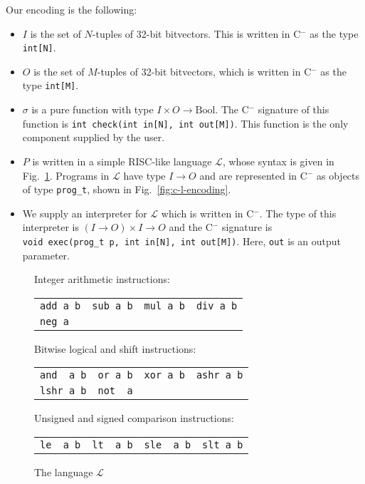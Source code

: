 \documentclass[a4paper]{llncs}
\newcommand{\newC}{C$^-$\xspace}
\begin{document}
Our encoding is the following:
%
\begin{itemize}
 \item $I$ is the set of $N$-tuples of 32-bit bitvectors.  This is written in \newC as the type \verb|int[N]|.
 \item $O$ is the set of $M$-tuples of 32-bit bitvectors, which is written in \newC as the type \verb|int[M]|.
 \item $\sigma$ is a pure function with type $I \times O \rightarrow \mathrm{Bool}$.  The \newC signature of this function is
 \verb|int check(int in[N], int out[M])|. This function is the only component supplied
 by the user.
 \item $P$ is written in a simple RISC-like language $\mathcal{L}$, whose syntax is given in Fig.~\ref{fig:l-language}.  Programs in $\mathcal{L}$
 have type $I \rightarrow O$ and
 are represented in \newC as objects of type \verb|prog_t|, shown in Fig.~\ref{fig:c-l-encoding}.
 \item We supply an interpreter for $\mathcal{L}$ which is written in \newC.  The type of
 this interpreter is $(I \rightarrow O) \times I \rightarrow O$ and the \newC signature is \\
 \verb|void exec(prog_t p, int in[N], int out[M])|.  Here, \verb|out| is an output parameter.
\end{itemize}

\begin{figure}
{\small
\begin{center}
\setlength{\tabcolsep}{16pt}
Integer arithmetic instructions:

\begin{tabular}{llll}
 \verb|add a b| & \verb|sub a b| & \verb|mul a b| & \verb|div a b| \\
 \verb|neg a| & & &
\end{tabular}

\medskip

Bitwise logical and shift instructions:

\begin{tabular}{llll}
 \verb|and  a b| & \verb|or a b| & \verb|xor a b| & \verb|ashr a b| \\
 \verb|lshr a b| & \verb|not  a| & &
\end{tabular}

\medskip

Unsigned and signed comparison instructions:

\begin{tabular}{llll}
 \verb|le  a b| & \verb|lt  a b| & \verb|sle  a b| & \verb|slt a b|
\end{tabular}
\end{center}
}
 \caption{The language $\mathcal{L}$}
 \label{fig:l-language}
\end{figure}
\end{document}
